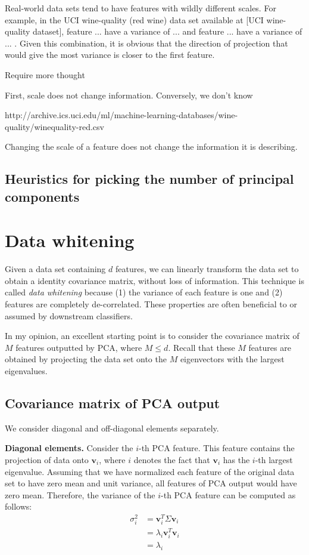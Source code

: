 \documentclass{article}
\newcommand{\vecv}{\boldsymbol{v}}
\begin{document}
Real-world data sets tend to have features with wildly different scales. For example, in the UCI wine-quality (red wine) data set available at [UCI wine-quality dataset], feature ... have a variance of ... and feature ... have a variance of ... . Given this combination, it is obvious that the direction of projection that would give the most variance is closer to the first feature.

Require more thought

First, scale does not change information. Conversely, we don't know 




 http://archive.ics.uci.edu/ml/machine-learning-databases/wine-quality/winequality-red.csv


Changing the scale of a feature does not change the information it is describing. 

\subsection{Heuristics for picking the number of principal components}

\section{Data whitening}

Given a data set containing $d$ features, we can linearly transform the data set to obtain a identity covariance matrix, without loss of information. This technique is called \textit{data whitening} because (1) the variance of each feature is one and (2) features are completely de-correlated. These properties are often beneficial to or assumed by downstream classifiers. 

\vspace{3mm}
In my opinion, an excellent starting point is to consider the covariance matrix of $M$ features outputted by PCA, where $M \leq d$. Recall that these $M$ features are obtained by projecting the data set onto the $M$ eigenvectors with the largest eigenvalues.

\subsection{Covariance matrix of PCA output}

We consider diagonal and off-diagonal elements separately.

\vspace{3mm}
\textbf{Diagonal elements.} Consider the $i$-th PCA feature. This feature contains the projection of data onto $\vecv_i$, where $i$ denotes the fact that $\vecv_i$ has the $i$-th largest eigenvalue. Assuming that we have normalized each feature of the original data set to have zero mean and unit variance, all features of PCA output would have zero mean. Therefore, the variance of the $i$-th PCA feature can be computed as follows:
\begin{align*}
\sigma_{i}^2 &=  \vecv_i^T \Sigma \vecv_i \\
&=  \lambda_i  \vecv_i^T \vecv_i \\
&= \lambda_i
\end{align*}
\end{document}
